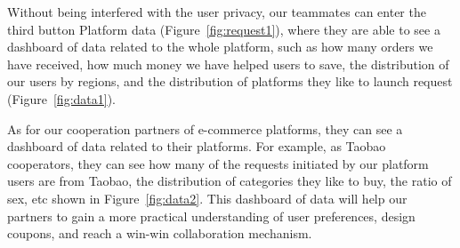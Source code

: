 Without being interfered with the user privacy, our teammates can enter the third button Platform data (Figure~\ref{fig:request1}), where they are able to see a dashboard of data related to the whole platform, such as how many orders we have received, how much money we have helped users to save, the distribution of our users by regions, and the distribution of platforms they like to launch request (Figure~\ref{fig:data1}).

As for our cooperation partners of e-commerce platforms, they can see a dashboard of data related to their platforms. For example, as Taobao cooperators, they can see how many of the requests initiated by our platform users are from Taobao, the distribution of categories they like to buy, the ratio of sex, etc shown in Figure~\ref{fig:data2}. This dashboard of data will help our partners to gain a more practical understanding of user preferences, design coupons, and reach a win-win collaboration mechanism.
